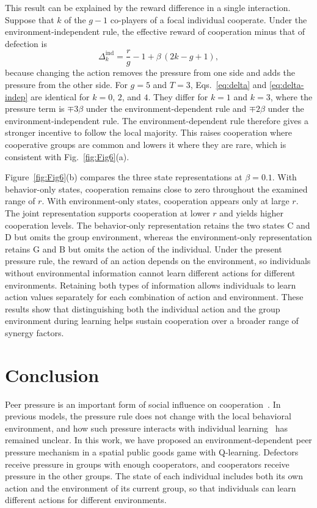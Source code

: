 \documentclass[%
  aip,cha,
  amsmath,amssymb,
  reprint,
  floatfix,
  article-title,
]{revtex4-2}
\begin{document}
This result can be explained by the reward difference in a single interaction. Suppose that $k$ of the $g-1$ co-players of a focal individual cooperate. Under the environment-independent rule, the effective reward of cooperation minus that of defection is
\begin{equation}
\Delta_k^{\mathrm{ind}}=\frac{r}{g}-1+\beta\,(2k-g+1),
\label{eq:delta-indep}
\end{equation}
because changing the action removes the pressure from one side and adds the pressure from the other side. For $g=5$ and $T=3$, Eqs.~\eqref{eq:delta} and \eqref{eq:delta-indep} are identical for $k=0$, $2$, and $4$. They differ for $k=1$ and $k=3$, where the pressure term is $\mp3\beta$ under the environment-dependent rule and $\mp2\beta$ under the environment-independent rule. The environment-dependent rule therefore gives a stronger incentive to follow the local majority. This raises cooperation where cooperative groups are common and lowers it where they are rare, which is consistent with Fig.~\ref{fig:Fig6}(a).

Figure~\ref{fig:Fig6}(b) compares the three state representations at $\beta=0.1$. With behavior-only states, cooperation remains close to zero throughout the examined range of $r$. With environment-only states, cooperation appears only at large $r$. The joint representation supports cooperation at lower $r$ and yields higher cooperation levels. The behavior-only representation retains the two states $\mathrm{C}$ and $\mathrm{D}$ but omits the group environment, whereas the environment-only representation retains $\mathrm{G}$ and $\mathrm{B}$ but omits the action of the individual. Under the present pressure rule, the reward of an action depends on the environment, so individuals without environmental information cannot learn different actions for different environments. Retaining both types of information allows individuals to learn action values separately for each combination of action and environment. These results show that distinguishing both the individual action and the group environment during learning helps sustain cooperation over a broader range of synergy factors.


\section{Conclusion}\label{sec:conclusion}

Peer pressure is an important form of social influence on cooperation~\cite{yang2015peer,deng2018peer,gao2023impact,ma2025evolution}. In previous models, the pressure rule does not change with the local behavioral environment, and how such pressure interacts with individual learning~\cite{xie2026reinforcement,zheng2026brief} has remained unclear. In this work, we have proposed an environment-dependent peer pressure mechanism in a spatial public goods game with Q-learning. Defectors receive pressure in groups with enough cooperators, and cooperators receive pressure in the other groups. The state of each individual includes both its own action and the environment of its current group, so that individuals can learn different actions for different environments.
\end{document}
